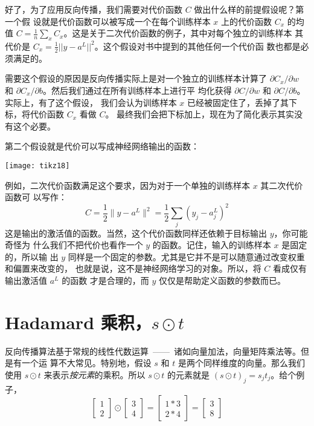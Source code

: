 好了，为了应用反向传播，我们需要对代价函数 $C$ 做出什么样的前提假设呢？第一个假
设就是代价函数可以被写成一个在每个训练样本 $x$ 上的代价函数 $C_x$ 的均值
$C=\frac{1}{n} \sum_x C_x$。这是关于二次代价函数的例子，其中对每个独立的训练样本
其代价是 $C_x = \frac{1}{2} ||y-a^L||^2$。这个假设对书中提到的其他任何一个代价函
数也都是必须满足的。

需要这个假设的原因是反向传播实际上是对一个独立的训练样本计算了 $\partial
C_x/\partial w$ 和 $\partial C_x/\partial b$。然后我们通过在所有训练样本上进行平
均化获得 $\partial C/\partial w$ 和 $\partial C/\partial b$。实际上，有了这个假设，
我们会认为训练样本 $x$ 已经被固定住了，丢掉了其下标，将代价函数 $C_x$ 看做 $C$。
最终我们会把下标加上，现在为了简化表示其实没有这个必要。

第二个假设就是代价可以写成神经网络输出的函数：

\begin{center}
  \texttt{[image: tikz18]}
\end{center}

例如，二次代价函数满足这个要求，因为对于一个单独的训练样本 $x$ 其二次代价函数可
以写作：
\begin{equation}
  C = \frac{1}{2} \|y-a^L\|^2 = \frac{1}{2} \sum_j (y_j-a^L_j)^2
  \label{eq:27}\tag{27}
\end{equation}
这是输出的激活值的函数。当然，这个代价函数同样还依赖于目标输出 $y$，你可能奇怪为
什么我们不把代价也看作一个 $y$ 的函数。记住，输入的训练样本 $x$ 是固定的，所以输
出 $y$ 同样是一个固定的参数。尤其是它并不是可以随意通过改变权重和偏置来改变的，
也就是说，这不是神经网络学习的对象。所以，将 $C$ 看成仅有输出激活值 $a^L$ 的函数
才是合理的，而 $y$ 仅仅是帮助定义函数的参数而已。

\section{Hadamard 乘积，$s \odot t$}
\label{sec:the_hadamard_product}

反向传播算法基于常规的线性代数运算~——~诸如向量加法，向量矩阵乘法等。但是有一个运
算不大常见。特别地，假设 $s$ 和 $t$ 是两个同样维度的向量。那么我们使用 $s\odot
t$ 来表示\emph{按元素}的乘积。所以 $s\odot t$ 的元素就是 $(s\odot t)_j = s_j
t_j$。给个例子，
\begin{equation}
  \left[\begin{array}{c} 1 \\ 2 \end{array}\right]
  \odot \left[\begin{array}{c} 3 \\ 4\end{array} \right]
  = \left[ \begin{array}{c} 1 * 3 \\ 2 * 4 \end{array} \right]
  = \left[ \begin{array}{c} 3 \\ 8 \end{array} \right]
  \label{eq:28}\tag{28}
\end{equation}

